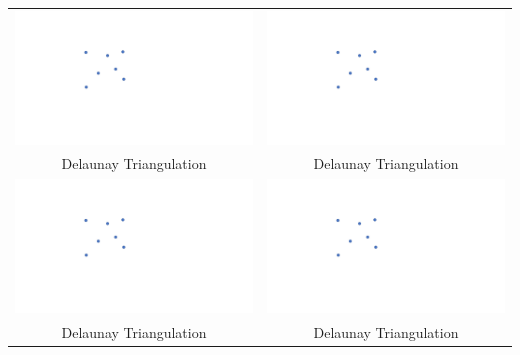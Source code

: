 \documentclass[a4paper,12pt]{article}
\begin{document}
\begin{tabular}{|c|c|}
\hline
\hspace{10pt}\includegraphics[width=0.425\linewidth]{../images/voronoi7.pdf}\hspace{10pt} & \hspace{10pt}\includegraphics[width=0.425\linewidth]{../images/voronoi7.pdf}\hspace{10pt} \\
Delaunay Triangulation & Delaunay Triangulation \\
\hline
\hspace{10pt}\includegraphics[width=0.425\linewidth]{../images/voronoi7.pdf}\hspace{10pt} & \hspace{10pt}\includegraphics[width=0.425\linewidth]{../images/voronoi7.pdf}\hspace{10pt} \\
Delaunay Triangulation & Delaunay Triangulation \\
\hline
\end{tabular}
\end{document}
